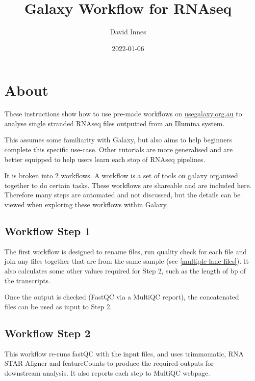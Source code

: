 \documentclass[
]{book}
\title{Galaxy Workflow for RNAseq}
\author{David Innes}
\date{2022-01-06}
\begin{document}
\maketitle

{
\setcounter{tocdepth}{1}
\tableofcontents
}
\hypertarget{about}{%
\chapter{About}\label{about}}

These instructions show how to use pre-made workflows on \url{usegalaxy.org.au}
to analyse single stranded RNAseq files outputted from an Illumina system.

This assumes some familiarity with Galaxy, but also aims to help beginners complete this specific use-case. Other tutorials are more generalised and are better equipped to help users learn each stop of RNAseq pipelines.

It is broken into 2 workflows. A workflow is a set of tools on galaxy organised together to do certain tasks. These workflows are shareable and are included here. Therefore many steps are automated and not discussed, but the details can be viewed when exploring these workflows within Galaxy.

\hypertarget{workflow-step-1}{%
\section*{Workflow Step 1}\label{workflow-step-1}}

The first workflow is designed to rename files, run quality check for each file and join any files together that are from the same sample (see \ref{multiple-lane-files}). It also calculates some other values required for Step 2, such as the length of bp of the transcripts.

Once the output is checked (FastQC via a MultiQC report), the concatenated files can be used as input to Step 2.

\hypertarget{workflow-step-2}{%
\section*{Workflow Step 2}\label{workflow-step-2}}

This workflow re-runs fastQC with the input files, and uses trimmomatic, RNA STAR Aligner and featureCounts to produce the required outputs for downstream analysis. It also reports each step to MultiQC webpage.
\end{document}
